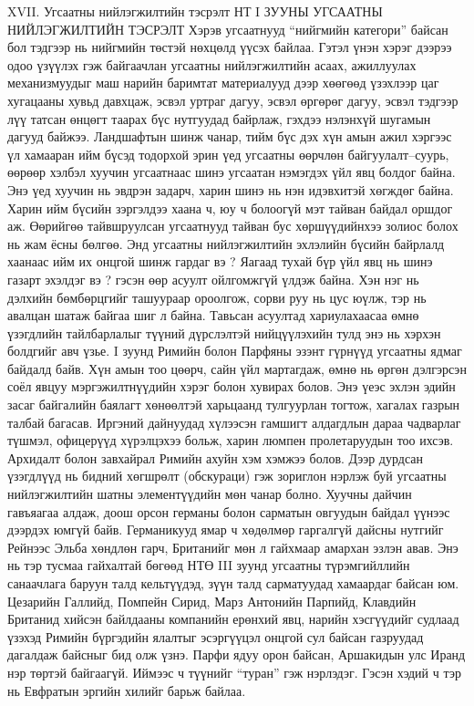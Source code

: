 XVII. Угсаатны нийлэгжилтийн тэсрэлт
НТ I ЗУУНЫ УГСААТНЫ НИЙЛЭГЖИЛТИЙН ТЭСРЭЛТ
Хэрэв угсаатнууд “нийгмийн категори” байсан бол тэдгээр нь нийгмийн төстэй нөхцөлд үүсэх байлаа. Гэтэл үнэн хэрэг дээрээ одоо үзүүлэх гэж байгаачлан угсаатны нийлэгжилтийн асаах, ажиллуулах механизмуудыг маш нарийн баримтат материалууд дээр хөөгөөд үзэхлээр цаг хугацааны хувьд давхцаж, эсвэл уртраг дагуу, эсвэл өргөрөг дагуу, эсвэл тэдгээр лүү татсан өнцөгт таарах бүс нутгуудад байрлаж, гэхдээ нэлэнхүй шугамын дагууд байжээ. Ландшафтын шинж чанар, тийм бүс дэх хүн амын ажил хэргээс үл хамааран ийм бүсэд тодорхой эрин үед угсаатны өөрчлөн байгуулалт–суурь, өөрөөр хэлбэл хуучин угсаатнаас шинэ угсаатан нэмэгдэх үйл явц болдог байна. Энэ үед хуучин нь эвдрэн задарч, харин шинэ нь нэн идэвхитэй хөгждөг байна.
Харин ийм бүсийн зэргэлдээ хаана ч, юу ч болоогүй мэт тайван байдал оршдог аж. Өөрийгөө тайвшруулсан угсаатнууд тайван бус хөршүүдийнхээ золиос болох нь жам ёсны бөлгөө. Энд угсаатны нийлэгжилтийн эхлэлийн бүсийн байрлалд хаанаас ийм их онцгой шинж гардаг вэ ? Яагаад тухай бүр үйл явц нь шинэ газарт эхэлдэг вэ ? гэсэн өөр асуулт ойлгомжгүй үлдэж байна. Хэн нэг нь дэлхийн бөмбөрцгийг ташуураар ороолгож, сорви руу нь цус юүлж, тэр нь авалцан шатаж байгаа шиг л байна.
Тавьсан асуултад хариулахаасаа өмнө үзэгдлийн тайлбарлалыг түүний дүрслэлтэй нийцүүлэхийн тулд энэ нь хэрхэн болдгийг авч үзье.
I зуунд Римийн болон Парфяны эзэнт гүрнүүд угсаатны ядмаг байдалд байв. Хүн амын тоо цөөрч, сайн үйл мартагдаж, өмнө нь өргөн дэлгэрсэн соёл явцуу мэргэжилтнүүдийн хэрэг болон хувирах болов. Энэ үеэс эхлэн эдийн засаг байгалийн баялагт хөнөөлтэй харьцаанд тулгуурлан тогтож, хагалах газрын талбай багасав. Иргэний дайнуудад хүлээсэн гамшигт алдагдлын дараа чадварлаг түшмэл, офицерүүд хүрэлцэхээ больж, харин люмпен пролетаруудын тоо ихсэв. Архидалт болон завхайрал Римийн ахуйн хэм хэмжээ болов. Дээр дурдсан үзэгдлүүд нь бидний хөгшрөлт (обскураци) гэж зориглон нэрлэж буй угсаатны нийлэгжилтийн шатны элементүүдийн мөн чанар болно.
Хуучны дайчин гавъяагаа алдаж, доош орсон германы болон сарматын овгуудын байдал үүнээс дээрдэх юмгүй байв. Германикууд ямар ч хөдөлмөр гаргалгүй дайсны нутгийг Рейнээс Эльба хөндлөн гарч, Британийг мөн л гайхмаар амархан эзлэн авав. Энэ нь тэр тусмаа гайхалтай бөгөөд НТӨ III зуунд угсаатны түрэмгийллийн санаачлага баруун талд кельтүүдэд, зүүн талд сарматуудад хамаардаг байсан юм. Цезарийн Галлийд, Помпейн Сирид, Марз Антонийн Парпийд, Клавдийн Британид хийсэн байлдааны компанийн ерөнхий явц, нарийн хэсгүүдийг судлаад үзэхэд Римийн бүргэдийн ялалтыг эсэргүүцэл онцгой сул байсан газруудад дагалдаж байсныг бид олж үзнэ. Парфи ядуу орон байсан, Аршакидын улс Иранд нэр төртэй байгаагүй. Иймээс ч түүнийг “туран” гэж нэрлэдэг. Гэсэн хэдий ч тэр нь Евфратын эргийн хилийг барьж байлаа.
